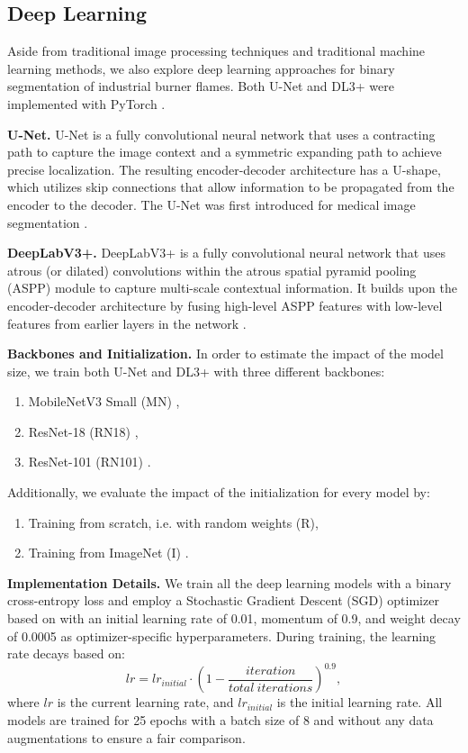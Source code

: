 \documentclass{isprs} %
\begin{document}
\subsection{Deep Learning}
Aside from traditional image processing techniques and traditional machine learning methods, we also explore deep learning approaches for binary segmentation of industrial burner flames. Both U-Net and DL3+ were implemented with PyTorch \citep{paszke2019PyTorchImperative}. 

\textbf{U-Net.} U-Net is a fully convolutional neural network that uses a contracting path to capture the image context and a symmetric expanding path to achieve precise localization. The resulting encoder-decoder architecture has a U-shape, which utilizes skip connections that allow information to be propagated from the encoder to the decoder. The U-Net was first introduced for medical image segmentation \citep{ronneberger2015u}. 

\textbf{DeepLabV3+.} DeepLabV3+ is a fully convolutional neural network that uses atrous (or dilated) convolutions within the atrous spatial pyramid pooling (ASPP) module to capture multi-scale contextual information. It builds upon the encoder-decoder architecture by fusing high-level ASPP features with low-level features from earlier layers in the network \citep{chen2018EncoderDecoderAtrous}.

\textbf{Backbones and Initialization.} In order to estimate the impact of the model size, we train both U-Net and DL3+ with three different backbones:
\begin{enumerate}
    \item MobileNetV3 Small (MN) \citep{howard2019searching},
    \item ResNet-18 (RN18) \citep{he2016deep},
    \item ResNet-101 (RN101) \citep{he2016deep}.
\end{enumerate}

Additionally, we evaluate the impact of the initialization for every model by:
\begin{enumerate}
    \item Training from scratch, i.e. with random weights (R),
    \item Training from ImageNet (I) \citep{deng2009ImageNetLargescale}.
\end{enumerate}

\textbf{Implementation Details.} We train all the deep learning models with a binary cross-entropy loss and employ a Stochastic Gradient Descent (SGD) optimizer based on \citet{robbins1951stochastic} with an initial learning rate of 0.01, momentum of 0.9, and weight decay of 0.0005 as optimizer-specific hyperparameters. During training, the learning rate decays based on:
\begin{equation}
lr = lr_{initial} \cdot (1 - \frac{iteration}{total\:iterations})^{0.9},
\end{equation}
where $lr$ is the current learning rate, and $lr_{initial}$ is the initial learning rate. All models are trained for 25 epochs with a batch size of 8 and without any data augmentations to ensure a fair comparison.
\end{document}
